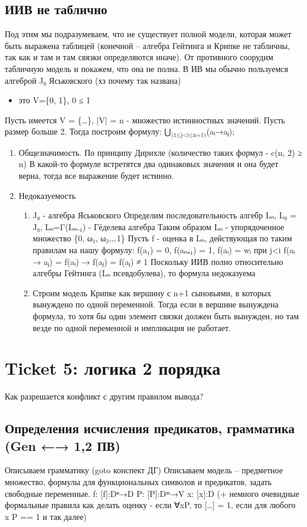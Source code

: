 \documentclass[11pt]{article}
\begin{document}
\subsection{ИИВ не таблично}
\label{sec-6-5}
Под этим мы подразумеваем, что не существует полной модели,
которая может быть выражена таблицей (конечной – алгебра Гейтинга
и Крипке не табличны, так как и там и там связки определяются иначе).
От противного соорудим табличную модель и покажем, что она не полна.
В ИВ мы обычно пользуемся алгеброй J₀ Яськовского (хз почему так названа)
\begin{itemize}
\item это V=\{0, 1\}, 0 ≤ 1
\end{itemize}
Пусть имеется V = \{\ldots{}\}, |V| = n - множество истинностных значений.
Пусть размер больше 2. Тогда построим формулу:
⋃$_{\text{(1≤j<i≤n+1)}}$(aᵢ→aⱼ);
\begin{enumerate}
\item Общезначимость.
По принципу Дирихле (количество таких формул - c(n, 2) ≥ n)
В какой-то формуле встретятся два одинаковых значения и она будет верна,
тогда все выражение будет истинно.
\item Недоказуемость
\begin{enumerate}
\item J₀ - алгебра Яськовского
Определим последовательность алгебр Lₙ, L₀ = J₀,
Lₙ=Γ(Lₙ₋₁) - Гёделева алгебра
Таким образом Lₙ - упорядоченное множество \{0, ω₁, ω₂,\ldots{}1\}
Пусть f - оценка в Lₙ, действующая по таким правилам на нашу формулу:
f(a₁) = 0, f(aₙ₊₁) = 1, f(aᵢ) = wᵢ
при j<i f(aᵢ → aⱼ) = f(aᵢ) → f(aⱼ) = f(aⱼ) ≠ 1
Поскольку ИИВ полно относительно алгебры Гейтинга (Lₙ псевдобулева),
то формула недоказуема
\item Строим модель Крипке как вершину с n+1 сыновьями, в которых вынуждено
по одной переменной. Тогда если в вершине вынуждена формула,
то хотя бы один элемент связки должен быть вынужден, но там везде
по одной переменной и импликация не работает.
\end{enumerate}
\end{enumerate}
\section{Ticket 5: логика 2 порядка}
\label{sec-7}
Как разрешается конфликт с другим правилом вывода?
\subsection{Определения исчисления предикатов, грамматика (Gen ←→ 1,2 ПВ)}
\label{sec-7-1}
Описываем грамматику (goto конспект ДГ)
Описываем модель – предметное множество, формулы для
функциональных символов и предикатов, задать свободные
переменные.
f: [f]:Dⁿ→D
P: [P]:Dᵐ→V
x: [x]:D
(+ немного очевидные формальные правила как делать
оценку - если ∀xP, то [\ldots{}] = 1, если для любого x
P == 1 и так далее)
\end{document}
